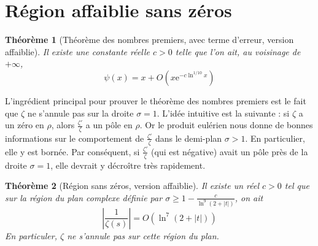 \documentclass[french]{report}
\newtheorem{theorem}{Théorème}[section]
\begin{document}
\section{Région affaiblie sans zéros}

\begin{theorem}[Théorème des nombres premiers, avec terme d'erreur, version affaiblie]\label{eq:tnp-erreur-1}
  Il existe une constante réelle $c>0$ telle que l'on ait, au voisinage de $+\infty$,
  \begin{equation}
    \psi(x)=x+O(x\mathrm{e}^{-c\ln^{1/10} x})
  \end{equation}
\end{theorem}

L'ingrédient principal pour prouver le théorème des nombres premiers est le fait que $\zeta$ ne s'annule pas sur la droite $\sigma=1$. L'idée intuitive est la suivante : si $\zeta$ a un zéro en $\rho$, alors $\frac{\zeta'}{\zeta}$ a un pôle en $\rho$. Or le produit eulérien nous donne de bonnes informations sur le comportement de $\frac{\zeta'}{\zeta}$ dans le demi-plan $\sigma>1$. En particulier, elle y est bornée. Par conséquent, si $\frac{\zeta'}{\zeta}$  (qui est négative) avait un pôle près de la droite $\sigma=1$, elle devrait y décroître très rapidement.

\begin{theorem}[Région sans zéros, version affaiblie]\label{eq:region-faible-sans-zero}
  Il existe un réel $c>0$ tel que sur la région du plan complexe définie par $\sigma\geq1-\frac{c}{\ln^9(2+|t|)}$, on ait
  \[ \left|\frac{1}{\zeta(s)}\right| = O(\ln^7(2+|t|)) \]
  En particuler, $\zeta$ ne s'annule pas sur cette région du plan.
\end{theorem}
\end{document}
